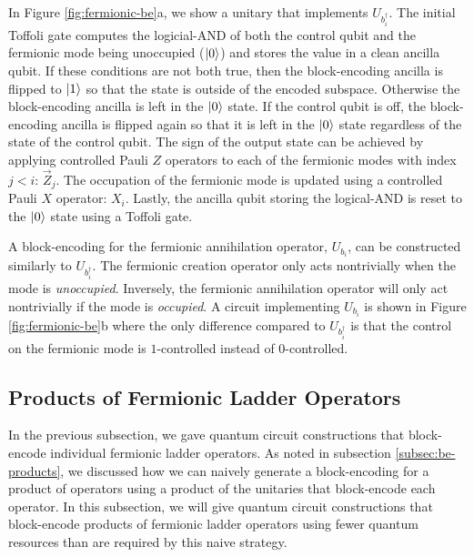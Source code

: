 In Figure \ref{fig:fermionic-be}a, we show a unitary that implements $U_{b^\dagger_i}$.
The initial Toffoli gate computes the logicial-AND of both the control qubit and the fermionic mode being unoccupied ($\ket{0}$) and stores the value in a clean ancilla qubit.
If these conditions are not both true, then the block-encoding ancilla is flipped to $\ket{1}$ so that the state is outside of the encoded subspace.
Otherwise the block-encoding ancilla is left in the $\ket{0}$ state.
If the control qubit is off, the block-encoding ancilla is flipped again so that it is left in the $\ket{0}$ state regardless of the state of the control qubit.
The sign of the output state can be achieved by applying controlled Pauli $Z$ operators to each of the fermionic modes with index $j < i$: $\vec{Z}_j$.
The occupation of the fermionic mode is updated using a controlled Pauli $X$ operator: $X_i$.
Lastly, the ancilla qubit storing the logical-AND is reset to the $\ket{0}$ state using a Toffoli gate.

A block-encoding for the fermionic annihilation operator, $U_{b_i}$, can be constructed similarly to $U_{b^\dagger_i}$.
The fermionic creation operator only acts nontrivially when the mode is \textit{unoccupied}.
Inversely, the fermionic annihilation operator will only act nontrivially if the mode is \textit{occupied}.
A circuit implementing $U_{b_i}$ is shown in Figure \ref{fig:fermionic-be}b where the only difference compared to $U_{b^\dagger_i}$ is that the control on the fermionic mode is $1$-controlled instead of $0$-controlled.

 

\subsection{Products of Fermionic Ladder Operators}

In the previous subsection, we gave quantum circuit constructions that block-encode individual fermionic ladder operators.
As noted in subsection \ref{subsec:be-products}, we discussed how we can naively generate a block-encoding for a product of operators using a product of the unitaries that block-encode each operator.
In this subsection, we will give quantum circuit constructions that block-encode products of fermionic ladder operators using fewer quantum resources than are required by this naive strategy.

